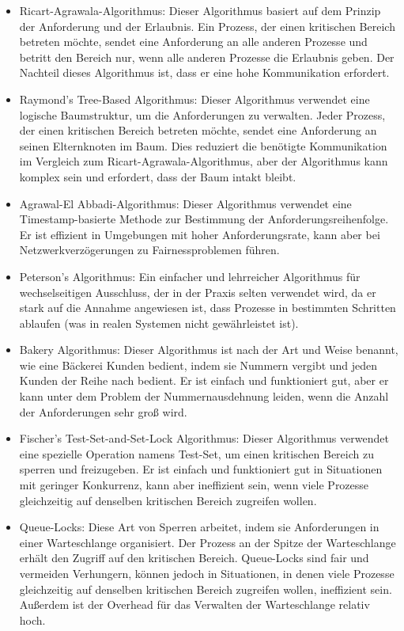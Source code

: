 \begin{itemize}
\item Ricart-Agrawala-Algorithmus: Dieser Algorithmus basiert auf dem Prinzip der Anforderung und der Erlaubnis. Ein Prozess, der einen kritischen Bereich betreten möchte, sendet eine Anforderung an alle anderen Prozesse und betritt den Bereich nur, wenn alle anderen Prozesse die Erlaubnis geben. Der Nachteil dieses Algorithmus ist, dass er eine hohe Kommunikation erfordert.

\item Raymond's Tree-Based Algorithmus: Dieser Algorithmus verwendet eine logische Baumstruktur, um die Anforderungen zu verwalten. Jeder Prozess, der einen kritischen Bereich betreten möchte, sendet eine Anforderung an seinen Elternknoten im Baum. Dies reduziert die benötigte Kommunikation im Vergleich zum Ricart-Agrawala-Algorithmus, aber der Algorithmus kann komplex sein und erfordert, dass der Baum intakt bleibt.

\item Agrawal-El Abbadi-Algorithmus: Dieser Algorithmus verwendet eine Timestamp-basierte Methode zur Bestimmung der Anforderungsreihenfolge. Er ist effizient in Umgebungen mit hoher Anforderungsrate, kann aber bei Netzwerkverzögerungen zu Fairnessproblemen führen.

\item Peterson's Algorithmus: Ein einfacher und lehrreicher Algorithmus für wechselseitigen Ausschluss, der in der Praxis selten verwendet wird, da er stark auf die Annahme angewiesen ist, dass Prozesse in bestimmten Schritten ablaufen (was in realen Systemen nicht gewährleistet ist).

\item Bakery Algorithmus: Dieser Algorithmus ist nach der Art und Weise benannt, wie eine Bäckerei Kunden bedient, indem sie Nummern vergibt und jeden Kunden der Reihe nach bedient. Er ist einfach und funktioniert gut, aber er kann unter dem Problem der Nummernausdehnung leiden, wenn die Anzahl der Anforderungen sehr groß wird.

\item  Fischer's Test-Set-and-Set-Lock Algorithmus: Dieser Algorithmus verwendet eine spezielle Operation namens Test-Set, um einen kritischen Bereich zu sperren und freizugeben. Er ist einfach und funktioniert gut in Situationen mit geringer Konkurrenz, kann aber ineffizient sein, wenn viele Prozesse gleichzeitig auf denselben kritischen Bereich zugreifen wollen.

\item  Queue-Locks: Diese Art von Sperren arbeitet, indem sie Anforderungen in einer Warteschlange organisiert. Der Prozess an der Spitze der Warteschlange erhält den Zugriff auf den kritischen Bereich. Queue-Locks sind fair und vermeiden Verhungern, können jedoch in Situationen, in denen viele Prozesse gleichzeitig auf denselben kritischen Bereich zugreifen wollen, ineffizient sein. Außerdem ist der Overhead für das Verwalten der Warteschlange relativ hoch.
\end{itemize}
